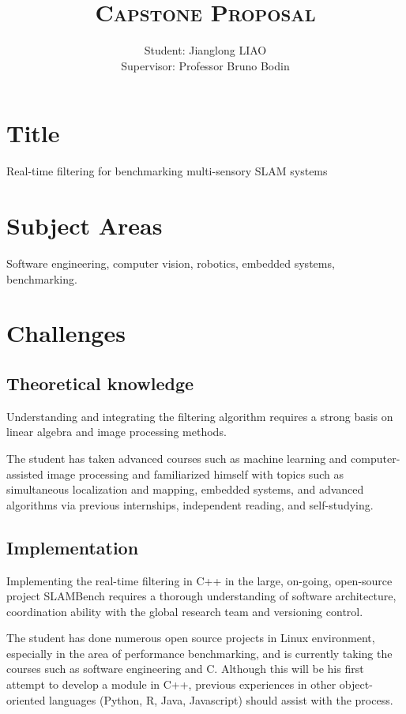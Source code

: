 \documentclass[11pt, oneside, a4paper]{article}
\author{
    Student: Jianglong LIAO\\
    Supervisor: Professor Bruno Bodin
    }
\title{\textsc{Capstone Proposal}}
\date{\vspace{-5ex}}
\begin{document}
\maketitle

\thispagestyle{fancy}


\section{Title}
Real-time filtering for benchmarking multi-sensory SLAM systems

\section{Subject Areas}
Software engineering, computer vision, robotics, embedded systems, benchmarking.

\section{Challenges}
\subsection{Theoretical knowledge}
Understanding and integrating the filtering algorithm requires a strong basis on linear algebra and image processing methods.

The student has taken advanced courses such as machine learning and computer-assisted image processing and familiarized himself with topics such as simultaneous localization and mapping, embedded systems, and advanced algorithms via previous internships, independent reading, and self-studying.

\subsection{Implementation}
Implementing the real-time filtering in C++ in the large, on-going, open-source project SLAMBench requires a thorough understanding of software architecture, coordination ability with the global research team and versioning control.

The student has done numerous open source projects in Linux environment, especially in the area of performance benchmarking, and is currently taking the courses such as software engineering and C. Although this will be his first attempt to develop a module in C++, previous experiences in other object-oriented languages (Python, R, Java, Javascript) should assist with the process.
\end{document}

